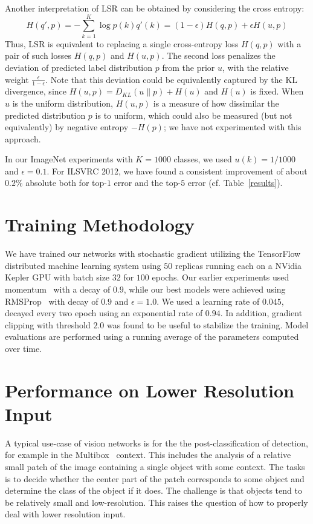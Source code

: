 \documentclass[10pt,twocolumn,letterpaper]{article}
\begin{document}
Another interpretation of LSR can be obtained by considering the cross entropy:
$$
H(q',p) = -\sum_{k=1}^K \log p(k) q'(k) = (1-\epsilon)H(q, p) + \epsilon H(u, p)
$$
Thus, LSR is equivalent to replacing a single cross-entropy loss $H(q,p)$ with a
pair of such losses $H(q,p)$ and $H(u,p)$. The second loss penalizes the
deviation of predicted label distribution $p$ from the prior $u$, with the 
relative weight $\frac{\epsilon}{1-\epsilon}$. Note that this deviation could be
equivalently captured by the KL divergence, since $H(u,p) = D_{KL}(u\|p) + H(u)$
and $H(u)$ is fixed. When $u$ is the uniform distribution, $H(u,p)$ is a measure
of how dissimilar the predicted distribution $p$ is to uniform, which could also be
measured (but not equivalently) by negative entropy $-H(p)$; we have not
experimented with this approach.

In our ImageNet experiments with $K=1000$ classes, we used $u(k) = 1/1000$ and
$\epsilon=0.1$. For ILSVRC 2012, we have found a consistent improvement of
about $0.2\%$ absolute both for top-$1$ error and the top-$5$ error
(cf. Table~\ref{results}).
 \section{Training Methodology}
We have trained our networks with stochastic gradient utilizing the
TensorFlow~\cite{tensorflow2015-whitepaper} distributed machine learning system
using $50$ replicas running each on a NVidia Kepler GPU with batch size $32$
for $100$ epochs.
Our earlier experiments used momentum~\cite{icml2013_sutskever13} with a
decay of $0.9$, while our best models were achieved using RMSProp~\cite{rmsprop}
with decay of $0.9$ and $\epsilon=1.0$. We used a learning rate of $0.045$,
decayed every two epoch using an exponential rate of $0.94$.
In addition, gradient clipping \cite{pascanu2012difficulty} with threshold $2.0$
was found to be useful to stabilize the training. Model evaluations are
performed using a running average of the parameters computed over time.
 \section{Performance on Lower Resolution Input}

A typical use-case of vision networks is for the the post-classification of
detection, for example in the Multibox~\cite{erhan2014scalable} context.
This includes
the analysis of a relative small patch of the image containing a single
object with some context. The tasks is to decide whether the center part
of the patch corresponds to some object and determine the class of the
object if it does. The challenge is that objects tend to be relatively
small and low-resolution. This raises the question of how to properly
deal with lower resolution input.
\end{document}
